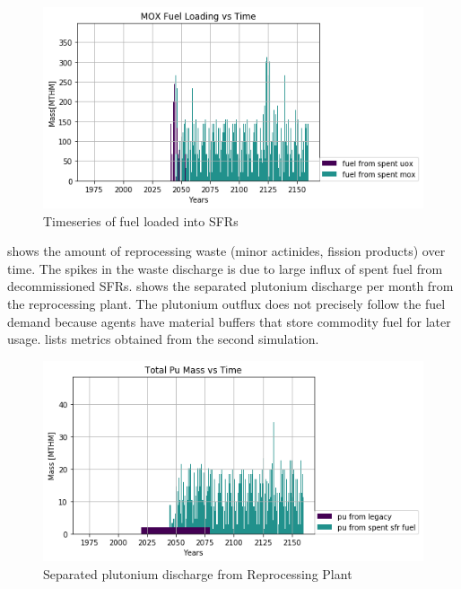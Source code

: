 \begin{figure}[htbp!]
	\begin{center}
		\includegraphics[scale=0.7]{./images/french-transition/where_fuel.png}
	\end{center}
	\caption{Timeseries of fuel loaded into \glspl{SFR}}
	\label{fig:fuel}
\end{figure}

 shows the amount of reprocessing waste
(minor actinides, fission products) over time. The spikes in the 
waste discharge is due to large influx of spent fuel from
decommissioned \glspl{SFR}. shows the separated plutonium discharge
per month from the reprocessing plant. The plutonium outflux
does not precisely follow the fuel demand because \Cyclus agents have
material buffers that store commodity fuel for later usage. 
 lists metrics obtained from the second simulation.

\begin{figure}[htbp!]
	\begin{center}
		\includegraphics[scale=0.7]{./images/french-transition/pu.png}
	\end{center}
	\caption{Separated plutonium discharge from Reprocessing Plant}
	\label{fig:pu_no_cum}
\end{figure}


